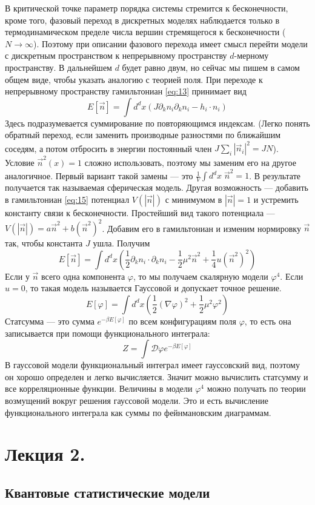 \documentclass[a4paper,12pt]{article}
\theoremstyle{definition}
\theoremstyle{definition}
\theoremstyle{definition}
\begin{document}
В критической точке параметр порядка системы стремится к бесконечности, кроме того, фазовый переход в дискретных моделях наблюдается только в термодинамическом пределе числа вершин стремящегося к бесконечности ($N\to \infty$). Поэтому при описании фазового перехода имеет смысл перейти модели с дискретным пространством  к непрерывному пространству $d$-мерному пространству. В дальнейшем $d$ будет равно двум, но сейчас мы пишем в самом общем виде, чтобы указать аналогию с теорией поля.
При переходе к непрерывному пространству гамильтониан \eqref{eq:13} принимает вид
\begin{equation}
  \label{eq:15}
  E[\vec n]=\int d^d x \left(J\partial_kn_i\partial_k  n_i-h_i\cdot n_i\right)
\end{equation}
Здесь подразумевается суммирование по повторяющимся индексам. (Легко понять обратный переход, если заменить производные разностями по ближайшим соседям, а потом отбросить в энергии постоянный член $J\sum_i \left|\vec n_i\right|^2=JN$).
Условие $\vec n^2(x)=1$ сложно использовать, поэтому мы заменим его на другое аналогичное. Первый вариант такой замены --- это $\frac{1}{V}\int d^dx\; \vec n^2=1$. В результате получается так называемая сферическая модель. Другая возможность --- добавить в гамильтониан \eqref{eq:15} потенциал $V(\left|\vec n\right|)$ с минимумом в $\left|\vec n\right|=1$ и устремить константу связи к бесконечности. Простейший вид такого потенциала --- $V(\left|\vec n\right|)=a\vec n^2+b\left(\vec n^2\right)^2$. Добавим его в гамильтониан и изменим нормировку $\vec n$ так, чтобы константа $J$ ушла. Получим
\begin{equation}
  \label{eq:16}
  E[\vec n]=\int d^d x \left(\frac{1}{2}\partial_k n_i\cdot \partial_k n_i-\frac{1}{2}\mu^2 \vec n^2+\frac{1}{4}u\left(\vec n^2\right)^2\right)
\end{equation}
Если у $\vec n$ всего одна компонента $\varphi$, то мы получаем скалярную модели $\varphi^4$. Если $u=0$, то такая модель называется Гауссовой и допускает точное решение.
\begin{equation}
  \label{eq:17}
  E[\varphi]=\int d^d x (\frac{1}{2}(\nabla \varphi)^2+\frac{1}{2}\mu^2 \varphi^2)
\end{equation}
Статсумма --- это сумма $e^{-\beta E[\varphi]}$ по всем конфигурациям поля $\varphi$, то есть она записывается при помощи функционального интеграла:
\begin{equation}
  \label{eq:18}
  Z=\int \mathcal{D}\varphi e^{-\beta E[\varphi]}
\end{equation}
В гауссовой модели функциональный интеграл имеет гауссовский вид, поэтому он хорошо определен и легко вычисляется. Значит можно вычислить статсумму и все корреляционные функции. Величины в модели $\varphi^4$ можно получать по теории возмущений вокруг решения гауссовой модели. Это и есть вычисление функционального интеграла как суммы по фейнмановским диаграммам. 

\section{Лекция 2. }
\label{sec:lecture-2}

\subsection{Квантовые статистические модели}
\label{sec:quantum-statistical-models}


{}

\end{document}
